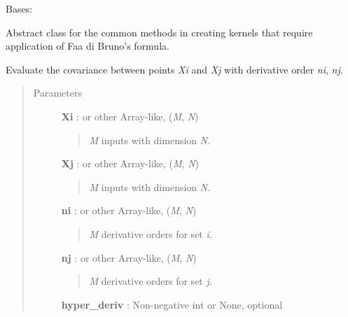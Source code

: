 \documentclass[letterpaper,10pt,english]{sphinxmanual}
\begin{document}
\begin{fulllineitems}
\label{gptools.kernel:gptools.kernel.core.ChainRuleKernel}
Bases: {\hyperref[gptools.kernel:gptools.kernel.core.Kernel]{}}

Abstract class for the common methods in creating kernels that require application of Faa di Bruno's formula.

\begin{fulllineitems}
\label{gptools.kernel:gptools.kernel.core.ChainRuleKernel.__call__}
Evaluate the covariance between points \emph{Xi} and \emph{Xj} with derivative order \emph{ni}, \emph{nj}.
\begin{quote}\begin{description}
\item[{Parameters }] \leavevmode
\textbf{Xi} :  or other Array-like, (\emph{M}, \emph{N})
\begin{quote}

\emph{M} inputs with dimension \emph{N}.
\end{quote}

\textbf{Xj} :  or other Array-like, (\emph{M}, \emph{N})
\begin{quote}

\emph{M} inputs with dimension \emph{N}.
\end{quote}

\textbf{ni} :  or other Array-like, (\emph{M}, \emph{N})
\begin{quote}

\emph{M} derivative orders for set \emph{i}.
\end{quote}

\textbf{nj} :  or other Array-like, (\emph{M}, \emph{N})
\begin{quote}

\emph{M} derivative orders for set \emph{j}.
\end{quote}

\textbf{hyper\_deriv} : Non-negative int or None, optional
\begin{quote}


\end{quote}
\end{description}
\end{quote}
\end{fulllineitems}
\end{fulllineitems}
\end{document}
